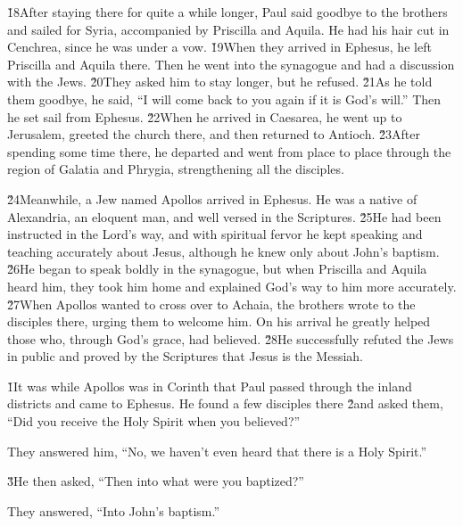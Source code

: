 \v{18}After staying there for quite a while longer, Paul said goodbye to the brothers and sailed for Syria, accompanied by Priscilla and Aquila. He had his hair cut in Cenchrea, since he was under a vow. \v{19}When they arrived in Ephesus, he left Priscilla and Aquila there. Then he went into the synagogue and had a discussion with the Jews. \v{20}They asked him to stay longer, but he refused. \v{21}As he told them goodbye, he said, ``I will come back to you again if it is God's will.'' Then he set sail from Ephesus. \v{22}When he arrived in Caesarea, he went up to Jerusalem, greeted the church there, and then returned to Antioch. \v{23}After spending some time there, he departed and went from place to place through the region of Galatia and Phrygia, strengthening all the disciples.

\v{24}Meanwhile, a Jew named Apollos arrived in Ephesus. He was a native of Alexandria, an eloquent man, and well versed in the Scriptures. \v{25}He had been instructed in the Lord's way, and with spiritual fervor he kept speaking and teaching accurately about Jesus, although he knew only about John's baptism. \v{26}He began to speak boldly in the synagogue, but when Priscilla and Aquila heard him, they took him home and explained God's way to him more accurately. \v{27}When Apollos wanted to cross over to Achaia, the brothers wrote to the disciples there, urging them to welcome him. On his arrival he greatly helped those who, through God's grace, had believed. \v{28}He successfully refuted the Jews in public and proved by the Scriptures that Jesus is the Messiah.

\v{1}It was while Apollos was in Corinth that Paul passed through the inland districts and came to Ephesus. He found a few disciples there \v{2}and asked them, ``Did you receive the Holy Spirit when you believed?''

They answered him, ``No, we haven't even heard that there is a Holy Spirit.''

\v{3}He then asked, ``Then into what were you baptized?''

They answered, ``Into John's baptism.''

